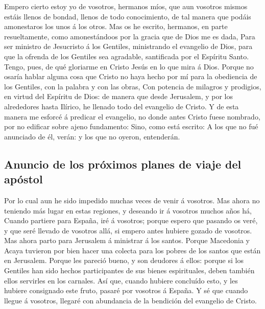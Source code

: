  Empero cierto estoy yo de vosotros, hermanos míos, que
aun vosotros mismos estáis llenos de bondad, llenos de todo
conocimiento, de tal manera que podáis amonestaros los unos á los otros.
 Mas os he escrito, hermanos, en parte resueltamente,
como amonestándoos por la gracia que de Dios me es dada, 
Para ser ministro de Jesucristo á los Gentiles, ministrando el evangelio
de Dios, para que la ofrenda de los Gentiles sea agradable, santificada
por el Espíritu Santo.  Tengo, pues, de qué gloriarme en
Cristo Jesús en lo que mira á Dios.  Porque no osaría
hablar alguna cosa que Cristo no haya hecho por mí para la obediencia de
los Gentiles, con la palabra y con las obras,  Con
potencia de milagros y prodigios, en virtud del Espíritu de Dios: de
manera que desde Jerusalem, y por los alrededores hasta Ilírico, he
llenado todo del evangelio de Cristo.  Y de esta manera
me esforcé á predicar el evangelio, no donde antes Cristo fuese
nombrado, por no edificar sobre ajeno fundamento:  Sino,
como está escrito: A los que no fué anunciado de él, verán: y los que no
oyeron, entenderán.

\hypertarget{anuncio-de-los-pruxf3ximos-planes-de-viaje-del-apuxf3stol}{%
\subsection{Anuncio de los próximos planes de viaje del
apóstol}\label{anuncio-de-los-pruxf3ximos-planes-de-viaje-del-apuxf3stol}}

 Por lo cual aun he sido impedido muchas veces de venir á
vosotros.  Mas ahora no teniendo más lugar en estas
regiones, y deseando ir á vosotros muchos años há, 
Cuando partiere para España, iré á vosotros; porque espero que pasando
os veré, y que seré llevado de vosotros allá, si empero antes hubiere
gozado de vosotros.  Mas ahora parto para Jerusalem á
ministrar á los santos.  Porque Macedonia y Acaya
tuvieron por bien hacer una colecta para los pobres de los santos que
están en Jerusalem.  Porque les pareció bueno, y son
deudores á ellos: porque si los Gentiles han sido hechos participantes
de sus bienes espirituales, deben también ellos servirles en los
carnales.  Así que, cuando hubiere concluído esto, y les
hubiere consignado este fruto, pasaré por vosotros á España.
 Y sé que cuando llegue á vosotros, llegaré con
abundancia de la bendición del evangelio de Cristo.

